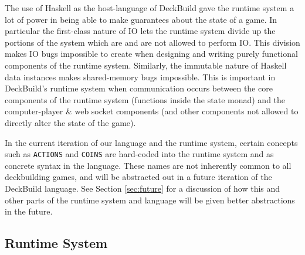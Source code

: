 The use of Haskell as the host-language of DeckBuild gave the runtime system
a lot of power in being able to make guarantees about the state of a game.
In particular the first-class nature of IO lets the runtime system divide
up the portions of the system which are and are not allowed to perform IO.
This division makes IO bugs impossible to create when designing and writing
purely functional components of the runtime system. Similarly, the immutable
nature of Haskell data instances makes shared-memory bugs impossible. This is
important in DeckBuild's runtime system when communication occurs between the
core components of the runtime system (functions inside the state monad)
and the computer-player \& web socket components (and other components not
allowed to directly alter the state of the game).

In the current iteration of our language and the runtime system, certain
concepts such as \texttt{ACTIONS} and \texttt{COINS}
are hard-coded into the runtime system and as concrete syntax in the language.
These names are not inherently common to all deckbuilding games, and will be
abstracted out in a future iteration of the DeckBuild language. See Section
\ref{sec:future} for a discussion of how this and other parts of the runtime
system and language will be given better abstractions in the future.

\subsection{Runtime System}


